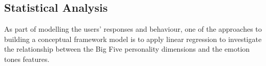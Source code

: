 \documentclass[graybox]{svmult}
\begin{document}
{%

\subsection{Statistical Analysis}

As part of modelling the users' responses and behaviour, one of the
approaches to building a conceptual framework model is to apply linear
regression to investigate the relationship between the Big Five
personality dimensions and the emotion tones features.


}
\end{document}

